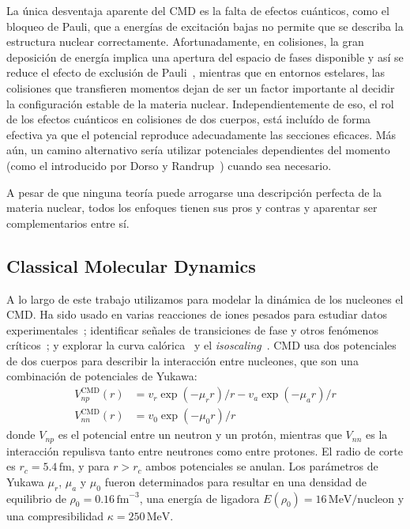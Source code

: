 La única desventaja aparente del CMD es la falta de efectos cuánticos, como el bloqueo de Pauli, que a energías de excitación bajas no permite que se describa la estructura nuclear correctamente.
Afortunadamente, en colisiones, la gran deposición de energía implica una apertura del espacio de fases disponible y así se reduce el efecto de exclusión de Pauli~\cite{lopez_lectures_2000}, mientras que en entornos estelares, las colisiones que transfieren momentos dejan de ser un factor importante al decidir la configuración estable de la materia nuclear.
Independientemente de eso, el rol de los efectos cuánticos en colisiones de dos cuerpos, está incluído de forma efectiva ya que el potencial reproduce adecuadamente las secciones eficaces.
Más aún, un camino alternativo sería utilizar potenciales dependientes del momento (como el introducido por Dorso y Randrup~\cite{dorso_classical_1988}) cuando sea necesario.

A pesar de que ninguna teoría puede arrogarse una descripción perfecta de la materia nuclear, todos los enfoques tienen sus pros y contras y aparentar ser complementarios entre sí.

\subsection{Classical Molecular Dynamics}\label{ssc:cmd}
A lo largo de este trabajo utilizamos para modelar la dinámica de los nucleones el CMD.\@
Ha sido usado en varias reacciones de iones pesados para estudiar datos experimentales~\cite{chernomoretz_quasiclassical_2002}; identificar señales de transiciones de fase y otros fenómenos críticos~\cite{lopez_lectures_2000, barranon_searching_2001, dorso_selection_2001, barranon_critical_2003, barranon_time_2007}; y explorar la curva calórica~\cite{barranon_entropy_2004} y el \emph{isoscaling}~\cite{dorso_dynamical_2006, dorso_isoscaling_2011}.
CMD usa dos potenciales de dos cuerpos para describir la interacción entre nucleones, que son una combinación de potenciales de Yukawa:
\begin{align*}
  V^{\text{CMD}}_{np}(r) &=v_{r}\exp(-\mu_{r}r)/{r}-v_{a}\exp(-\mu_{a}r)/{r}\\
  V^{\text{CMD}}_{nn}(r) &=v_{0}\exp(-\mu_{0}r)/{r}
\end{align*}
donde $V_{np}$ es el potencial entre un neutron y un protón, mientras que $V_{nn}$ es la interacción repulisva tanto entre neutrones como entre protones.
El radio de corte es $r_c=5.4\,\text{fm}$, y para $r>r_c$ ambos potenciales se anulan.
Los parámetros de Yukawa $\mu_r$, $\mu_a$ y $\mu_0$ fueron determinados para resultar en una densidad de equilibrio de $\rho_0=0.16\,\text{fm}^{-3}$, una energía de ligadora $E(\rho_0)=16\,\text{MeV/nucleon}$ y una compresibilidad $\kappa=250\,\text{MeV}$.

